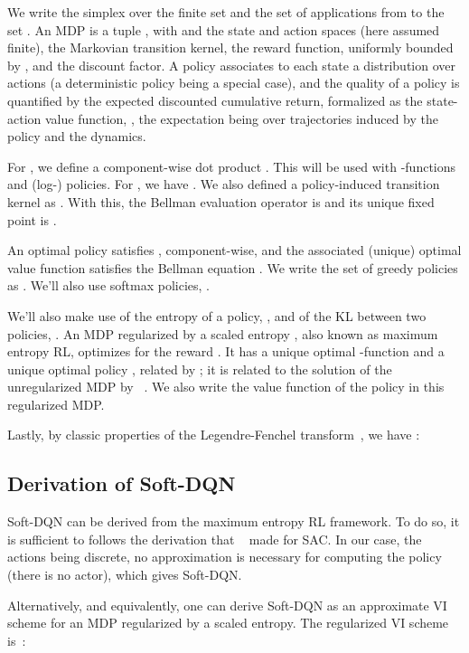 \documentclass{article}
\begin{document}
We write  the simplex over the finite set  and  the set of applications from  to the set . An MDP is a tuple , with  and  the state and action spaces (here assumed finite),  the Markovian transition kernel,  the reward function, uniformly bounded by , and  the discount factor. A policy  associates to each state a distribution over actions (a deterministic policy being a special case), and the quality of a policy is quantified by the expected discounted cumulative return, formalized as the state-action value function, , the expectation being over trajectories induced by the policy  and the dynamics. 

For , we define a component-wise dot product . This will be used with -functions and (log-) policies. For , we have . We also defined a policy-induced transition kernel  as . With this, the Bellman evaluation operator is  and its unique fixed point is .

An optimal policy satisfies , component-wise, and the associated (unique) optimal value function  satisfies the Bellman equation . We write the set of greedy policies as . We'll also use softmax policies, .

We'll also make use of the entropy of a policy, , and of the KL between two policies, . An MDP regularized by a scaled entropy , also known as maximum entropy RL, optimizes for the reward . It has a unique optimal -function  and a unique optimal policy , related by ; it is related to the solution of the unregularized MDP by ~\cite{geist2019theory}. We also write  the value function of the policy  in this regularized MDP.

Lastly, by classic properties of the Legendre-Fenchel transform~\cite{boyd2004convex,vieillard2020leverage}, we have  :



\subsection{Derivation of Soft-DQN}
\label{subappx:Soft-DQN}

Soft-DQN can be derived from the maximum entropy RL framework. To do so, it is sufficient to follows the derivation that ~\citet{haarnoja2018soft} made for SAC. In our case, the actions being discrete, no approximation is necessary for computing the policy (there is no actor), which gives Soft-DQN.

Alternatively, and equivalently, one can derive Soft-DQN as an approximate VI scheme for an MDP regularized by a scaled entropy. The regularized VI scheme is~\cite{geist2019theory,vieillard2020leverage}:
\end{document}

